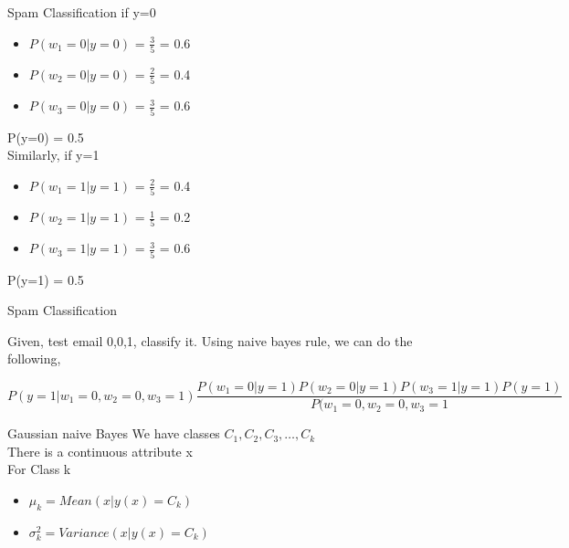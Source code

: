 \documentclass{beamer}
\begin{document}
\begin{frame}{Spam Classification}
    if y=0
    \begin{itemize}
        \item $P(w_{1}=0\vert y=0)$ = $\frac{3}{5}$ = 0.6 \\
        \item $P(w_{2}=0\vert y=0)$ = $\frac{2}{5}$ = 0.4 \\
        \item $P(w_{3}=0\vert y=0)$ = $\frac{3}{5}$ = 0.6 \\
    \end{itemize}
    P(y=0) = 0.5\\
    Similarly, if y=1
    \begin{itemize}
        \item $P(w_{1}=1\vert y=1)$ = $\frac{2}{5}$ = 0.4 \\
        \item $P(w_{2}=1\vert y=1)$ = $\frac{1}{5}$ = 0.2 \\
        \item $P(w_{3}=1\vert y=1)$ = $\frac{3}{5}$ = 0.6 \\
    \end{itemize}
    P(y=1) = 0.5
\end{frame}

\begin{frame}{Spam Classification}
    
    Given, test email {0,0,1}, classify it. Using naive bayes rule, we can do the following, 
    \begin{center}
$$
        P(y=1\vert w_{1}=0,w_{2} = 0,w_{3}=1) 
         \frac{P(w_{1}=0|y=1) P(w_{2}=0|y=1) P(w_{3}=1|y=1) P(y=1)}{P(w_{1}=0, w_{2}=0, w_{3}=1} 
    $$
    
    \end{center}
    
\end{frame}

%    
%    

\begin{frame}{Gaussian naive Bayes}
    We have classes $C_{1}, C_{2}, C_{3},\dots, C_{k}$\\
    There is a continuous attribute x\\
    For Class k 
    \begin{itemize}
        \item $\mu_{k} = Mean(x \vert y(x) = C_{k})$
        \item $\sigma_{k}^{2} = Variance(x \vert y(x)=C_{k})$
    \end{itemize}
    
\end{frame}
\end{document}
